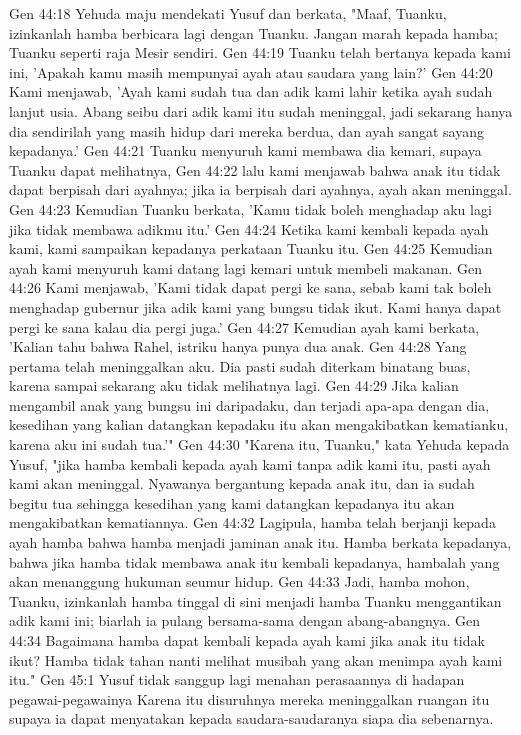 Gen 44:18  Yehuda maju mendekati Yusuf dan berkata, "Maaf, Tuanku, izinkanlah hamba berbicara lagi dengan Tuanku. Jangan marah kepada hamba; Tuanku seperti raja Mesir sendiri.
Gen 44:19  Tuanku telah bertanya kepada kami ini, 'Apakah kamu masih mempunyai ayah atau saudara yang lain?'
Gen 44:20  Kami menjawab, 'Ayah kami sudah tua dan adik kami lahir ketika ayah sudah lanjut usia. Abang seibu dari adik kami itu sudah meninggal, jadi sekarang hanya dia sendirilah yang masih hidup dari mereka berdua, dan ayah sangat sayang kepadanya.'
Gen 44:21  Tuanku menyuruh kami membawa dia kemari, supaya Tuanku dapat melihatnya,
Gen 44:22  lalu kami menjawab bahwa anak itu tidak dapat berpisah dari ayahnya; jika ia berpisah dari ayahnya, ayah akan meninggal.
Gen 44:23  Kemudian Tuanku berkata, 'Kamu tidak boleh menghadap aku lagi jika tidak membawa adikmu itu.'
Gen 44:24  Ketika kami kembali kepada ayah kami, kami sampaikan kepadanya perkataan Tuanku itu.
Gen 44:25  Kemudian ayah kami menyuruh kami datang lagi kemari untuk membeli makanan.
Gen 44:26  Kami menjawab, 'Kami tidak dapat pergi ke sana, sebab kami tak boleh menghadap gubernur jika adik kami yang bungsu tidak ikut. Kami hanya dapat pergi ke sana kalau dia pergi juga.'
Gen 44:27  Kemudian ayah kami berkata, 'Kalian tahu bahwa Rahel, istriku hanya punya dua anak.
Gen 44:28  Yang pertama telah meninggalkan aku. Dia pasti sudah diterkam binatang buas, karena sampai sekarang aku tidak melihatnya lagi.
Gen 44:29  Jika kalian mengambil anak yang bungsu ini daripadaku, dan terjadi apa-apa dengan dia, kesedihan yang kalian datangkan kepadaku itu akan mengakibatkan kematianku, karena aku ini sudah tua.'"
Gen 44:30  "Karena itu, Tuanku," kata Yehuda kepada Yusuf, "jika hamba kembali kepada ayah kami tanpa adik kami itu, pasti ayah kami akan meninggal. Nyawanya bergantung kepada anak itu, dan ia sudah begitu tua sehingga kesedihan yang kami datangkan kepadanya itu akan mengakibatkan kematiannya.
Gen 44:32  Lagipula, hamba telah berjanji kepada ayah hamba bahwa hamba menjadi jaminan anak itu. Hamba berkata kepadanya, bahwa jika hamba tidak membawa anak itu kembali kepadanya, hambalah yang akan menanggung hukuman seumur hidup.
Gen 44:33  Jadi, hamba mohon, Tuanku, izinkanlah hamba tinggal di sini menjadi hamba Tuanku menggantikan adik kami ini; biarlah ia pulang bersama-sama dengan abang-abangnya.
Gen 44:34  Bagaimana hamba dapat kembali kepada ayah kami jika anak itu tidak ikut? Hamba tidak tahan nanti melihat musibah yang akan menimpa ayah kami itu."
Gen 45:1  Yusuf tidak sanggup lagi menahan perasaannya di hadapan pegawai-pegawainya Karena itu disuruhnya mereka meninggalkan ruangan itu supaya ia dapat menyatakan kepada saudara-saudaranya siapa dia sebenarnya.
